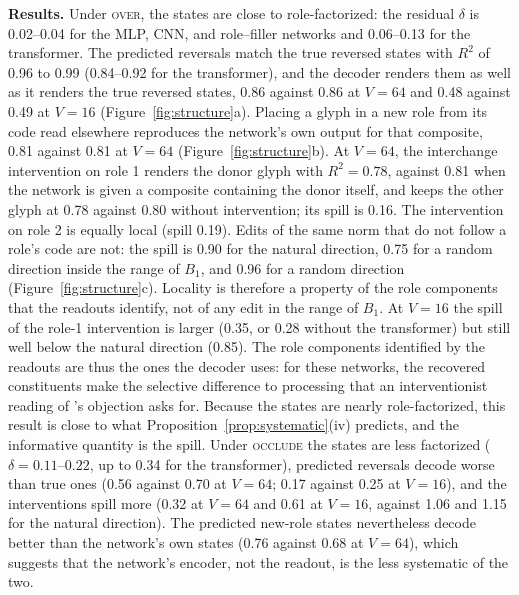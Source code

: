 \documentclass[10pt]{article}
\theoremstyle{plain}
\theoremstyle{remark}
\begin{document}
\textbf{Results.} Under \textsc{over}, the states are close to role-factorized: the residual $\delta$ is 0.02--0.04 for the MLP, CNN, and role--filler networks and 0.06--0.13 for the transformer. The predicted reversals match the true reversed states with $R^2$ of 0.96 to 0.99 (0.84--0.92 for the transformer), and the decoder renders them as well as it renders the true reversed states, 0.86 against 0.86 at $V = 64$ and 0.48 against 0.49 at $V = 16$ (Figure~\ref{fig:structure}a). Placing a glyph in a new role from its code read elsewhere reproduces the network's own output for that composite, 0.81 against 0.81 at $V = 64$ (Figure~\ref{fig:structure}b). At $V = 64$, the interchange intervention on role 1 renders the donor glyph with $R^2 = 0.78$, against 0.81 when the network is given a composite containing the donor itself, and keeps the other glyph at 0.78 against 0.80 without intervention; its spill is 0.16. The intervention on role 2 is equally local (spill 0.19). Edits of the same norm that do not follow a role's code are not: the spill is 0.90 for the natural direction, 0.75 for a random direction inside the range of $B_1$, and 0.96 for a random direction (Figure~\ref{fig:structure}c). Locality is therefore a property of the role components that the readouts identify, not of any edit in the range of $B_1$. At $V = 16$ the spill of the role-1 intervention is larger (0.35, or 0.28 without the transformer) but still well below the natural direction (0.85). The role components identified by the readouts are thus the ones the decoder uses: for these networks, the recovered constituents make the selective difference to processing that an interventionist reading of \citet{fodor1990}'s objection asks for. Because the states are nearly role-factorized, this result is close to what Proposition~\ref{prop:systematic}(iv) predicts, and the informative quantity is the spill. Under \textsc{occlude} the states are less factorized ($\delta = 0.11$--$0.22$, up to 0.34 for the transformer), predicted reversals decode worse than true ones (0.56 against 0.70 at $V = 64$; 0.17 against 0.25 at $V = 16$), and the interventions spill more (0.32 at $V = 64$ and 0.61 at $V = 16$, against 1.06 and 1.15 for the natural direction). The predicted new-role states nevertheless decode better than the network's own states (0.76 against 0.68 at $V = 64$), which suggests that the network's encoder, not the readout, is the less systematic of the two.
\end{document}
